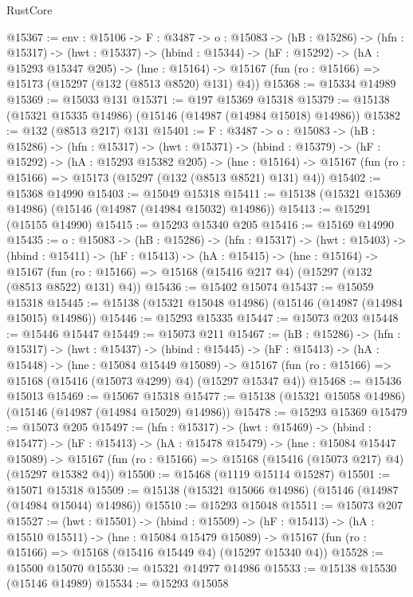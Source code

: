 \begin{lexlean}{RustCore}
\begin{coremodule}
@15367 := {env : @15106} ->
  {F : @3487} ->
  {o : @15083} ->
  (hB : @15286) ->
  (hfn : @15317) ->
  (hwt : @15337) ->
  (hbind : @15344) ->
  (hF : @15292) ->
  (hA : @15293 @15347 @205) ->
  (hne : @15164) -> @15167 (fun (ro : @15166) => @15173 (@15297 (@132 (@8513 @8520) @131) @4))
@15368 := @15334 @14989
@15369 := @15033 @131
@15371 := @197 @15369 @15318
@15379 := @15138 (@15321 @15335 @14986) (@15146 (@14987 (@14984 @15018) @14986))
@15382 := @132 (@8513 @217) @131
@15401 := {F : @3487} ->
  {o : @15083} ->
  (hB : @15286) ->
  (hfn : @15317) ->
  (hwt : @15371) ->
  (hbind : @15379) ->
  (hF : @15292) ->
  (hA : @15293 @15382 @205) ->
  (hne : @15164) -> @15167 (fun (ro : @15166) => @15173 (@15297 (@132 (@8513 @8521) @131) @4))
@15402 := @15368 @14990
@15403 := @15049 @15318
@15411 := @15138 (@15321 @15369 @14986) (@15146 (@14987 (@14984 @15032) @14986))
@15413 := @15291 (@15155 @14990)
@15415 := @15293 @15340 @205
@15416 := @15169 @14990
@15435 := {o : @15083} ->
  (hB : @15286) ->
  (hfn : @15317) ->
  (hwt : @15403) ->
  (hbind : @15411) ->
  (hF : @15413) ->
  (hA : @15415) ->
  (hne : @15164) ->
  @15167 (fun (ro : @15166) => @15168 (@15416 @217 @4) (@15297 (@132 (@8513 @8522) @131) @4))
@15436 := @15402 @15074
@15437 := @15059 @15318
@15445 := @15138 (@15321 @15048 @14986) (@15146 (@14987 (@14984 @15015) @14986))
@15446 := @15293 @15335
@15447 := @15073 @203
@15448 := @15446 @15447
@15449 := @15073 @211
@15467 := (hB : @15286) ->
  (hfn : @15317) ->
  (hwt : @15437) ->
  (hbind : @15445) ->
  (hF : @15413) ->
  (hA : @15448) ->
  (hne : @15084 @15449 @15089) ->
  @15167 (fun (ro : @15166) => @15168 (@15416 (@15073 @4299) @4) (@15297 @15347 @4))
@15468 := @15436 @15013
@15469 := @15067 @15318
@15477 := @15138 (@15321 @15058 @14986) (@15146 (@14987 (@14984 @15029) @14986))
@15478 := @15293 @15369
@15479 := @15073 @205
@15497 := (hfn : @15317) ->
  (hwt : @15469) ->
  (hbind : @15477) ->
  (hF : @15413) ->
  (hA : @15478 @15479) ->
  (hne : @15084 @15447 @15089) ->
  @15167 (fun (ro : @15166) => @15168 (@15416 (@15073 @217) @4) (@15297 @15382 @4))
@15500 := @15468 (@1119 @15114 @15287)
@15501 := @15071 @15318
@15509 := @15138 (@15321 @15066 @14986) (@15146 (@14987 (@14984 @15044) @14986))
@15510 := @15293 @15048
@15511 := @15073 @207
@15527 := (hwt : @15501) ->
  (hbind : @15509) ->
  (hF : @15413) ->
  (hA : @15510 @15511) ->
  (hne : @15084 @15479 @15089) ->
  @15167 (fun (ro : @15166) => @15168 (@15416 @15449 @4) (@15297 @15340 @4))
@15528 := @15500 @15070
@15530 := @15321 @14977 @14986
@15533 := @15138 @15530 (@15146 @14989)
@15534 := @15293 @15058

\end{coremodule}
\end{lexlean}
